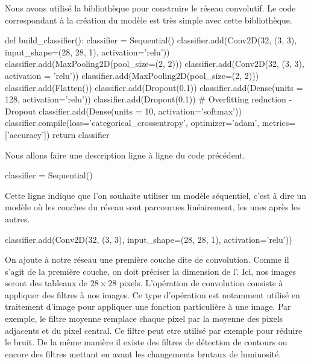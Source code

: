 Nous avons utilisé la bibliothèque \Python {} pour construire 
le réseau convolutif. 
Le code correspondant à la création du modèle est très simple avec cette 
bibliothèque.

\begin{codeblock}
def build_classifier():
    classifier = Sequential()
    classifier.add(Conv2D(32, (3, 3), input_shape=(28, 28, 1), activation='relu'))
    classifier.add(MaxPooling2D(pool_size=(2, 2)))
    classifier.add(Conv2D(32, (3, 3), activation = 'relu'))
    classifier.add(MaxPooling2D(pool_size=(2, 2)))
    classifier.add(Flatten())
    classifier.add(Dropout(0.1)) 
    classifier.add(Dense(units = 128, activation='relu'))
    classifier.add(Dropout(0.1)) # Overfitting reduction - Dropout
    classifier.add(Dense(units = 10, activation='softmax'))
    classifier.compile(loss='categorical_crossentropy', optimizer='adam', metrics=['accuracy'])
    return classifier
\end{codeblock}

Nous allons faire une description ligne à ligne du code précédent.

\begin{codeblock}
classifier = Sequential()
\end{codeblock}

Cette ligne indique que l'on souhaite utiliser un modèle séquentiel, 
c'est à dire un modèle où les couches du réseau sont parcourues linéairement, 
les unes après les autres.

\begin{codeblock}
classifier.add(Conv2D(32, (3, 3), input_shape=(28, 28, 1), activation='relu'))
\end{codeblock}

On ajoute à notre réseau une première couche dite de convolution. 
Comme il s'agit de la première couche, on doit préciser la dimension de 
l'. 
Ici, nos images seront des tableaux de $28 \times 28$ pixels.  
L'opération de convolution consiste à appliquer des filtres à nos images. Ce type 
d'opération est notamment utilisé en traitement d'image pour appliquer une fonction
particulière à une image. Par exemple, le filtre moyenne remplace chaque pixel par la 
moyenne des pixels adjacents et du pixel central. Ce filtre peut etre utilisé par
exemple pour réduire le bruit. De la même manière il existe des filtres de détection de 
contours ou encore des filtres mettant en avant les changements brutaux de luminosité.

